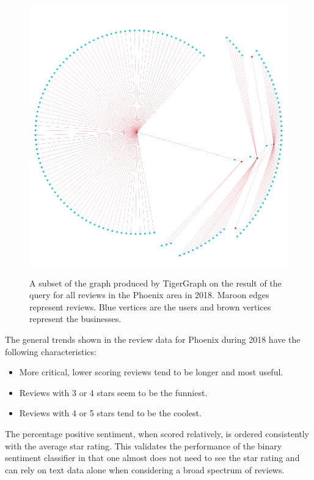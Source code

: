 \begin{figure}[h]
    \centering
    \begin{mdframed}[backgroundcolor=gray!70!white, style=GraphFrame]
    {\includegraphics[width=\textwidth]{img/reviewsGraph.png}}
    \end{mdframed}
    \caption{A subset of the graph produced by TigerGraph on the result of the query for all reviews in the Phoenix area in 2018. Maroon edges represent reviews. Blue vertices are the users and brown vertices represent the businesses.}
    \label{fig:reviewGraph}
\end{figure}

The general trends shown in the review data for Phoenix during 2018 have the following characteristics:

\begin{itemize}
    \item More critical, lower scoring reviews tend to be longer and most useful.
    \item Reviews with 3 or 4 stars seem to be the funniest.
    \item Reviews with 4 or 5 stars tend to be the coolest.
\end{itemize}

The percentage positive sentiment, when scored relatively, is ordered consistently with the average star rating. This validates the performance of the binary sentiment classifier in that one almost does not need to see the star rating and can rely on text data alone when considering a broad spectrum of reviews.

